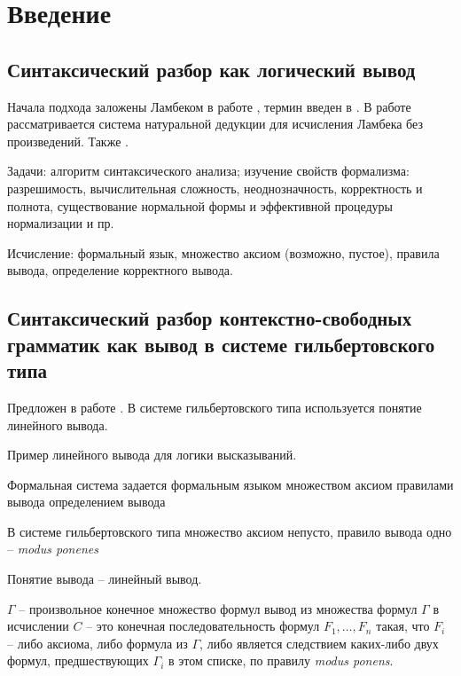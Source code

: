 \chapter{Введение}

\section{Синтаксический разбор как логический вывод}

Начала подхода заложены Ламбеком в работе \parencite{lambek1958mathematics}, термин введен в \parencite{pereira1983parsing}. В работе \parencite{konig1989parsing} рассматривается система натуральной дедукции для исчисления Ламбека без произведений. Также \parencite{moot2012logic}.

Задачи: алгоритм синтаксического анализа; изучение свойств формализма: разрешимость, вычислительная сложность, неоднозначность, корректность и полнота, существование нормальной формы и эффективной процедуры нормализации и пр.

Исчисление: формальный язык, множество аксиом (возможно, пустое), правила вывода, определение корректного вывода.

\section{Синтаксический разбор контекстно-свободных грамматик как вывод в системе гильбертовского типа}

Предложен в работе \parencite{pereira1983parsing}. В системе гильбертовского типа используется понятие линейного вывода.

Пример линейного вывода для логики высказываний.

Формальная система задается 
формальным языком
множеством аксиом
правилами вывода
определением вывода

В системе гильбертовского типа 
множество аксиом непусто,
правило вывода одно -- \textit{modus ponenes}

\begin{prooftree}
\end{prooftree}

Понятие вывода -- линейный вывод.

$\Gamma$ -- произвольное конечное множество формул
вывод из множества формул $\Gamma$ в исчислении $C$ -- это конечная последовательность формул $F_1, \dots, F_n$ такая, что $F_i$ -- либо аксиома, либо формула из $\Gamma$, либо является следствием каких-либо двух формул, предшествующих $\Gamma_i$ в этом списке, по правилу \textit{modus ponens}.

